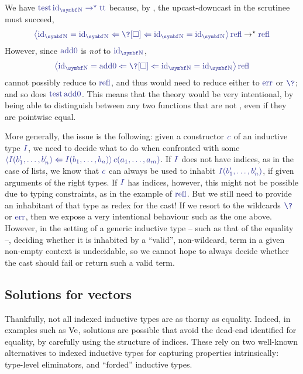 We have $\tcol{\test \id_{\Nat} \red \tcol{\true}}$ because, by , the
upcast-downcast in the scrutinee must succeed, \ie
\[\tcol{\cast{\eqty{\id_{\Nat}}{\id_{\Nat}}}{\eqty{\id_{\Nat}}{\id_{\Nat}} \Leftarrow \?[\uni]}{\refl}} \red \tcol{\refl[\id_{\Nat}]}\]
However, since $\tcol{\addz}$ is \emph{not}  to $\tcol{\id_{\Nat}}$,
\[\tcol{\cast{\eqty{\id_{\Nat}}{\id_{\Nat}}}{\eqty{\id_{\Nat}}{\addz} \Leftarrow \?[\uni]}{\refl}}\]
cannot possibly reduce to $\tcol{\refl}$, and
thus would need to reduce either to $\tcol{\err}$ or $\tcol{\?}$;
and so does $\tcol{\test \addz}$.
%
This means that the theory would be very intentional, by being able to distinguish between
any two functions that are not , even if they are pointwise equal.

More generally, the issue is the following: given a constructor $\tcol{c}$
of an inductive type $\tcol{I}$, we need to decide what to do when confronted with some
$\tcol{\cast{I(b_1, \dots, b_n)}{I(b'_1, \dots, b'_n)}{c(a_1, \dots, a_m)}}$.
If $\tcol{I}$ does not have indices, as in the case of lists, we know that $\tcol{c}$
can always be used to inhabit $\tcol{I(b_1', \dots, b_n')}$,
if given arguments of the right types.
If $\tcol{I}$ has indices, however, this might not be possible due to typing constraints,
as in the example of $\tcol{\refl}$.
But we still need to provide an inhabitant of that type as redex for the cast! If we resort to
the wildcards $\tcol{\?}$ or $\tcol{\err}$,
then we expose a very intentional behaviour such as the one above.
However, in the setting of a generic inductive type
– such as that of the equality –, deciding whether it is inhabited by a “valid”,
non-wildcard, term in a given non-empty context is undecidable,
so we cannot hope to always decide whether the cast should fail or
return such a valid term.

\subsection{Solutions for vectors}

Thankfully, not all indexed inductive types are as thorny as equality. Indeed,
in examples such as $\operatorname{Ve}$,%
solutions are possible that avoid the dead-end identified for equality, by carefully
using the structure of indices. These rely on two well-known alternatives to indexed
inductive types for capturing properties intrinsically: type-level eliminators,
and “forded” inductive types.

